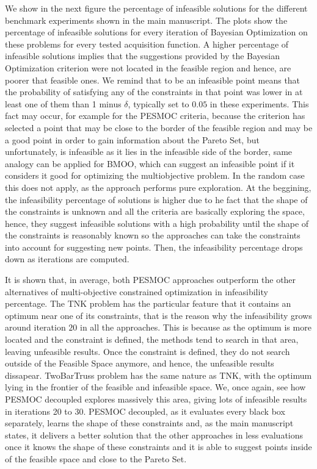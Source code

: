 \documentclass[review,preprint,12pt]{elsarticle}
\begin{document}
We show in the next figure the percentage of infeasible solutions for the different benchmark experiments shown in the main manuscript. The plots show the percentage of infeasible solutions for every iteration of Bayesian Optimization on these problems for every tested acquisition function. A higher percentage of infeasible solutions implies that the suggestions provided by the Bayesian Optimization criterion were not located in the feasible region and hence, are poorer that feasible ones. We remind that to be an infeasible point means that the probability of satisfying any of the constraints in that point was lower in at least one of them than 1 minus $\delta$, typically set to $0.05$ in these experiments. This fact may occur, for example for the PESMOC criteria, because the criterion has selected a point that may be close to the border of the feasible region and may be a good point in order to gain information about the Pareto Set, but unfortunately, is infeasible as it lies in the infeasible side of the border, same analogy can be applied for BMOO, which can suggest an infeasible point if it considers it good for optimizing the multiobjective problem. In the random case this does not apply, as the approach performs pure exploration.  At the beggining, the infeasibility percentage of solutions is higher due to he fact that the shape of the constraints is unknown and all the criteria are basically exploring the space, hence, they suggest infeasible solutions with a high probability until the shape of the constraints is reasonably known so the approaches can take the constraints into account for suggesting new points. Then, the infeasibility percentage drops down as iterations are computed.

It is shown that, in average, both PESMOC approaches outperform the other alternatives of multi-objective constrained optimization in infeasibility percentage. The TNK problem has the particular feature that it contains an optimum near one of its constraints, that is the reason why the infeasibility grows around iteration $20$ in all the approaches. This is because as the optimum is more located and the constraint is defined, the methods tend to search in that area, leaving unfeasible results. Once the constraint is defined, they do not search outside of the Feasible Space anymore, and hence, the unfeasible results dissapear. TwoBarTruss problem has the same nature as TNK, with the optimum lying in the frontier of the feasible and infeasible space. We, once again, see how PESMOC decoupled explores massively this area, giving lots of infeasible results in iterations 20 to 30. PESMOC decoupled, as it evaluates every black box separately, learns the shape of these constraints and, as the main manuscript states, it delivers a better solution that the other approaches in less evaluations once it knows the shape of these constraints and it is able to suggest points inside of the feasible space and close to the Pareto Set.
\end{document}

